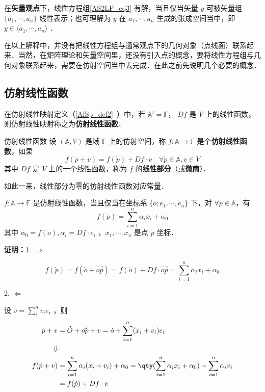 在\textbf{矢量观点}下，线性方程组\autoref{AS2LF_eq3} 有解，当且仅当矢量 $y$ 可被矢量组 $\{a_1,\cdots,a_n\}$ 线性表示；也可理解为 $y$ 在 $a_1,\cdots,a_n$ 生成的张成空间当中，即$y\in\langle a_1,\cdots,a_n\rangle$ ．

在以上解释中，并没有把线性方程组与通常观点下的几何对象（点线面）联系起来．当然，在矩阵理论和矢量空间里，还没有引入点的概念，要将线性方程组与几何对象联系起来，需要在仿射空间当中去完成．在此之前先说明几个必要的概念．
\subsection{仿射线性函数}
在仿射线性映射定义（\autoref{AfSp_def2}~）中，若 $\mathbb A'=\mathbb F$， $Df$ 是 $V$ 上的线性函数，则仿射线性映射称之为\textbf{仿射线性函数}．
\begin{definition}{仿射线性函数}
设 $(\mathbb A,V)$ 是域 $\mathbb {F}$ 上的仿射空间，称 $f:\mathbb A\rightarrow \mathbb F$ 是个\textbf{仿射线性函数}，如果
\begin{equation}
f(\dot p+v)=f(\dot p)+Df\cdot v\quad\forall \dot p\in\mathbb A,v\in V
\end{equation}
其中 $Df$ 是 $V$ 上的一个线性函数，称为 $f$ 的\textbf{线性部分}（或\textbf{微商}）．
\end{definition}
如此一来，线性部分为零的仿射线性函数对应常量．
\begin{theorem}{}
 $f:\mathbb A\rightarrow \mathbb F$ 是仿射线性函数，当且仅当在坐标系 $\{\dot o;e_1,\cdots,e_n\}$ 下，对 $\forall \dot p\in \mathbb A$，有
 \begin{equation}
 f(\dot p)=\sum_{i=1}^n\alpha_ix_i+\alpha_0
 \end{equation}
 其中 $\alpha_0=f(\dot o),\alpha_i=Df\cdot e_i$ ，$x_1,\cdots,x_n$ 是点 $\dot p$ 坐标．
\end{theorem}
\textbf{证明：}1. $\Rightarrow$

\begin{equation}
f(\dot p)=f(\dot o+\vec{op})=f(\dot o)+Df\cdot \vec{op}=\sum_{i=1}^n \alpha_i x_i+\alpha_0
\end{equation}

2. $\Leftarrow$

设 $v=\sum_{i}^n v_ie_i$ ，则
\begin{equation}
\begin{aligned}
\dot p+v&=\dot O+\vec{op}+v=\dot o+\sum_{i=1}^n (x_i+v_i)e_i\\
\Downarrow\\
f(\dot p+v)&=\sum_{i=1}^n\alpha_i(x_i+v_i)+\alpha_0=\qty(\sum_{i=1}^n\alpha_i x_i+\alpha_0)+\sum_{i=1}^n\alpha_i v_i\\
&=f(\dot p)+Df\cdot v
\end{aligned}
\end{equation}

